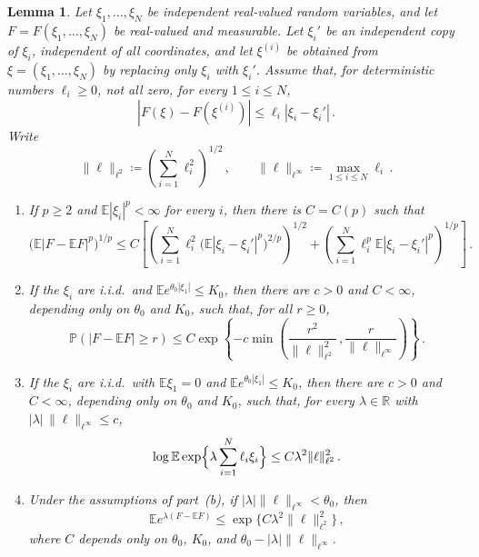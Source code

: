 \documentclass[11pt]{amsart}
\theoremstyle{plain}
\newtheorem{lemma}[theorem]{Lemma}
\theoremstyle{definition}
\newcommand{\R}{\mathbb{R}}
\newcommand{\E}{\mathbb{E}}
\renewcommand{\P}{\mathbb{P}}
\begin{document}
	\begin{lemma}\label{lem:weighted-exp-conc}
		Let $\xi_1,\ldots,\xi_N$ be independent real-valued random variables, and let $F=F(\xi_1,\ldots,\xi_N)$ be real-valued and measurable. Let $\xi_i'$ be an independent copy of $\xi_i$, independent of all coordinates, and let $\xi^{(i)}$ be obtained from $\xi=(\xi_1,\ldots,\xi_N)$ by replacing only $\xi_i$ with $\xi_i'$. Assume that, for deterministic numbers $\ell_i\geq0$, not all zero, for every $1\leq i\leq N$,
		\[
			|F(\xi)-F(\xi^{(i)})|\leq \ell_i|\xi_i-\xi_i'|\, .
		\]
		Write
		\[
			\|\ell\|_{\ell^2}\coloneqq\left(\sum_{i=1}^N\ell_i^2\right)^{1/2}\, ,
			\qquad
			\|\ell\|_{\ell^\infty}\coloneqq\max_{1\leq i\leq N}\ell_i\, .
		\]
		\begin{enumerate}[label=\textup{(\alph*)}]
			\item If $p\geq2$ and $\E|\xi_i|^p<\infty$ for every $i$, then there is
			$C=C(p)$ such that
			\[
				\bigl(\E|F-\E F|^p\bigr)^{1/p}
				\leq
				C
				\left[
				\left(\sum_{i=1}^N \ell_i^2\bigl(\E|\xi_i-\xi_i'|^p\bigr)^{2/p}\right)^{1/2}
				+
				\left(\sum_{i=1}^N \ell_i^p \E|\xi_i-\xi_i'|^p\right)^{1/p}
				\right]\, .
			\]

			\item If the $\xi_i$ are i.i.d.\ and
			$\E e^{\theta_0|\xi_1|}\leq K_0$, then there are $c>0$ and $C<\infty$, depending
			only on $\theta_0$ and $K_0$, such that, for all $r\geq0$,
			\[
				\P(|F-\E F|\geq r)
				\leq
				C\exp\left\{
				-c\min\left(
				\frac{r^2}{\|\ell\|_{\ell^2}^2}\, , 
					\frac{r}{\|\ell\|_{\ell^\infty}}
				\right)
				\right\}\, .
			\]

				\item If the $\xi_i$ are i.i.d.\ with $\E\xi_1=0$ and
				$\E e^{\theta_0|\xi_1|}\leq K_0$, then there are $c>0$ and
				$C<\infty$, depending only on $\theta_0$ and $K_0$, such that,
				for every $\lambda\in\R$ with
				$|\lambda|\,\|\ell\|_{\ell^\infty}\leq c$,
				\[
					\log\E\exp\Bigl\{\lambda\sum_{i=1}^N\ell_i\xi_i\Bigr\}
					\leq
					C\lambda^2\|\ell\|_{\ell^2}^2\, .
				\]

			\item Under the assumptions of part~\textup{(b)}, if
				$|\lambda|\|\ell\|_{\ell^\infty}<\theta_0$, then
				\[
					\E e^{\lambda(F-\E F)}
					\leq
					\exp\{C\lambda^2\|\ell\|_{\ell^2}^2\}\, ,
				\]
				where $C$ depends only on $\theta_0$, $K_0$, and
				$\theta_0-|\lambda|\|\ell\|_{\ell^\infty}$.
		\end{enumerate}
	\end{lemma}
\end{document}
